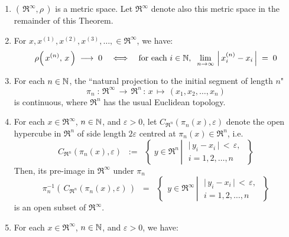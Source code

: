 \begin{theorem}\mbox{}
\begin{enumerate}
\item	$\left(\,\Re^{\infty},\rho\,\right)$ is a metric space.
		Let $\Re^{\infty}$ denote also this metric space in the remainder of this Theorem.
\item	For $x, x^{(1)}, x^{(2)}, x^{(3)}, \ldots, \in \Re^{\infty}$, we have:
		\begin{equation*}
		\rho\!\left(\,x^{(n)},\,x\,\right) \; \longrightarrow \; 0
		\quad\Longleftrightarrow\quad
		\textnormal{for each $i \in \mathbb{N}$},\;\;
		\lim_{n\rightarrow\infty}\,\left\vert\,x^{(n)}_{i} - x_{i}\,\right\vert \; = \; 0
		\end{equation*}
\item	For each $n \in \mathbb{N}$, the ``natural projection to the initial segment of length $n$"
		\begin{equation*}
		\pi_{n} \; : \, \Re^{\infty} \,\longrightarrow\, \Re^{n} \, : \, x \,\longmapsto\, (x_{1},x_{2},\ldots,x_{n})
		\end{equation*}
		is continuous, where $\Re^{n}$ has the usual Euclidean topology.
\item	For each $x \in \Re^{\infty}$, $n \in \mathbb{N}$, and $\varepsilon > 0$,
		let $C_{\Re^{n}}(\pi_{n}(x),\varepsilon)$ denote the open hypercube in $\Re^{n}$
		of side length $2\varepsilon$ centred at $\pi_{n}(x) \in \Re^{n}$, i.e.
		\begin{equation*}
		C_{\Re^{n}}(\pi_{n}(x),\varepsilon)
		\;\; := \;\;
		\left\{\;
		y \in \Re^{n}
		\,\left\vert\;
		\begin{array}{c} \vert\,y_{i} - x_{i}\,\vert\,<\,\varepsilon,\\ i = 1, 2, \ldots, n\end{array}
		\right.		
		\;\right\}
		\end{equation*}
		Then, its pre-image in $\Re^{\infty}$ under $\pi_{n}$
		\begin{equation*}
		\pi_{n}^{-1}\!\left(\,C_{\Re^{n}}(\pi_{n}(x),\varepsilon)\,\right)
		\;\; = \;\;
		\left\{\;\,
		y \in \Re^{\infty}
		\,\left\vert\;
		\begin{array}{c} \vert\,y_{i} - x_{i}\,\vert\,<\,\varepsilon,\\ i = 1, 2, \ldots, n\end{array}
		\right.
		\;\right\}
		\end{equation*}
		is an open subset of $\Re^{\infty}$.
\item	For each $x \in \Re^{\infty}$, $n \in \mathbb{N}$, and $\varepsilon > 0$, we have:

\end{enumerate}
\end{theorem}

